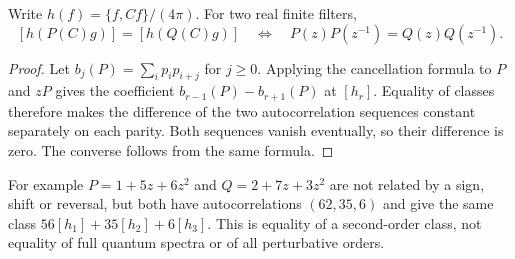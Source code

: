 \begin{corollary}
Write $h(f)=\{f,Cf\}/(4\pi)$. For two real finite filters,
\[
 [h(P(C)g)]=[h(Q(C)g)]
 \quad\Longleftrightarrow\quad
 P(z)P(z^{-1})=Q(z)Q(z^{-1}).
\]
\end{corollary}
\begin{proof}
Let $b_j(P)=\sum_i p_ip_{i+j}$ for $j\ge0$. Applying the cancellation
formula to $P$ and $zP$ gives the coefficient
$b_{r-1}(P)-b_{r+1}(P)$ at $[h_r]$. Equality of classes therefore makes the
difference of the two autocorrelation sequences constant separately on each
parity. Both sequences vanish eventually, so their difference is zero.
The converse follows from the same formula.
\end{proof}
For example $P=1+5z+6z^2$ and $Q=2+7z+3z^2$ are not related by a sign,
shift or reversal, but both have autocorrelations $(62,35,6)$ and give the
same class $56[h_1]+35[h_2]+6[h_3]$. This is equality of a second-order
class, not equality of full quantum spectra or of all perturbative orders.

